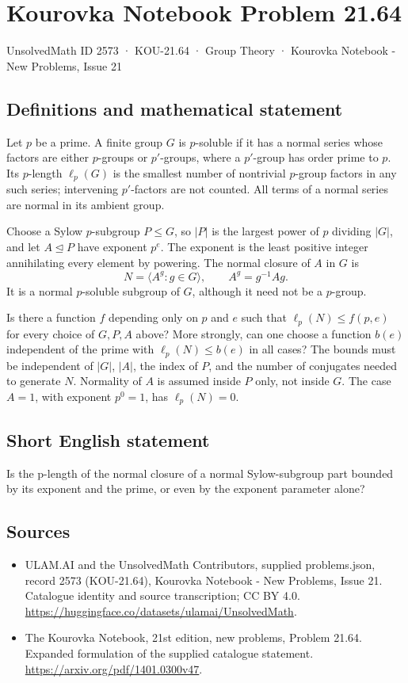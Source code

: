 \documentclass[11pt,a4paper]{article}
\begin{document}
\section*{Kourovka Notebook Problem 21.64}\label{2573}
{\small UnsolvedMath ID 2573 · KOU-21.64 · Group Theory · Kourovka Notebook - New Problems, Issue 21}
\subsection{Definitions and mathematical statement}
Let $p$ be a prime. A finite group $G$ is $p$-soluble if it has a
normal series whose factors are either $p$-groups or $p'$-groups,
where a $p'$-group has order prime to $p$. Its $p$-length
$\ell_p(G)$ is the smallest number of nontrivial $p$-group factors
in any such series; intervening $p'$-factors are not counted.
All terms of a normal series are normal in its ambient group.

Choose a Sylow $p$-subgroup $P\le G$, so $|P|$ is the largest power
of $p$ dividing $|G|$, and let $A\trianglelefteq P$ have exponent
$p^e$. The exponent is the least positive integer annihilating every
element by powering. The normal closure of $A$ in $G$ is
\[
 N=\langle A^g:g\in G\rangle,
 \qquad A^g=g^{-1}Ag.
\]
It is a normal $p$-soluble subgroup of $G$, although it need not be
a $p$-group.

Is there a function $f$ depending only on $p$ and $e$ such that
$\ell_p(N)\le f(p,e)$ for every choice of $G,P,A$ above? More
strongly, can one choose a function $b(e)$ independent of the prime
with $\ell_p(N)\le b(e)$ in all cases?
The bounds must be independent of $|G|$, $|A|$, the index of $P$,
and the number of conjugates needed to generate $N$. Normality of $A$
is assumed inside $P$ only, not inside $G$. The case $A=1$, with
exponent $p^0=1$, has $\ell_p(N)=0$.
\subsection{Short English statement}
Is the p-length of the normal closure of a normal Sylow-subgroup part bounded by its exponent and the prime, or even by the exponent parameter alone?
\subsection{Sources}
\begin{itemize}
\item[S1] ULAM.AI and the UnsolvedMath Contributors, supplied problems.json, record 2573 (KOU-21.64), Kourovka Notebook - New Problems, Issue 21. Catalogue identity and source transcription; CC BY 4.0.
\url{https://huggingface.co/datasets/ulamai/UnsolvedMath}.
\item[S2] The Kourovka Notebook, 21st edition, new problems, Problem 21.64. Expanded formulation of the supplied catalogue statement.
\url{https://arxiv.org/pdf/1401.0300v47}.
\end{itemize}
\end{document}
